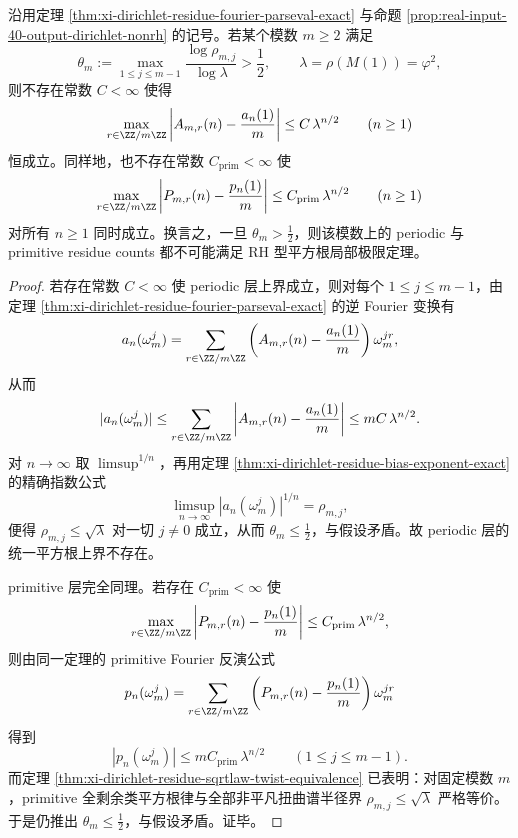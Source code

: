 \begin{theorem}\label{thm:xi-dirichlet-local-limit-sqrt-barrier}
沿用定理 \ref{thm:xi-dirichlet-residue-fourier-parseval-exact} 与命题 \ref{prop:real-input-40-output-dirichlet-nonrh} 的记号。若某个模数 \(m\ge 2\) 满足
\[
\theta_m:=\max_{1\le j\le m-1}\frac{\log\rho_{m,j}}{\log\lambda}>\frac12,
\qquad
\lambda=\rho(M(1))=\varphi^2,
\]
则不存在常数 \(C<\infty\) 使得
\[
\max_{r\in\ZZ/m\ZZ}\left|A_{m,r}(n)-\frac{a_n(1)}{m}\right|
\le C\,\lambda^{n/2}
\qquad (n\ge 1)
\]
恒成立。同样地，也不存在常数 \(C_{\mathrm{prim}}<\infty\) 使
\[
\max_{r\in\ZZ/m\ZZ}\left|P_{m,r}(n)-\frac{p_n(1)}{m}\right|
\le C_{\mathrm{prim}}\,\lambda^{n/2}
\qquad (n\ge 1)
\]
对所有 \(n\ge 1\) 同时成立。换言之，一旦 \(\theta_m>\frac12\)，则该模数上的 periodic 与 primitive residue counts 都不可能满足 RH 型平方根局部极限定理。
\end{theorem}
\begin{proof}
若存在常数 \(C<\infty\) 使 periodic 层上界成立，则对每个 \(1\le j\le m-1\)，由定理 \ref{thm:xi-dirichlet-residue-fourier-parseval-exact} 的逆 Fourier 变换有
\[
a_n(\omega_m^j)
=
\sum_{r\in\ZZ/m\ZZ}
\left(A_{m,r}(n)-\frac{a_n(1)}{m}\right)\omega_m^{jr},
\]
从而
\[
|a_n(\omega_m^j)|
\le
\sum_{r\in\ZZ/m\ZZ}\left|A_{m,r}(n)-\frac{a_n(1)}{m}\right|
\le
mC\,\lambda^{n/2}.
\]
对 \(n\to\infty\) 取 \(\limsup^{1/n}\)，再用定理 \ref{thm:xi-dirichlet-residue-bias-exponent-exact} 的精确指数公式
\[
\limsup_{n\to\infty}|a_n(\omega_m^j)|^{1/n}=\rho_{m,j},
\]
便得 \(\rho_{m,j}\le \sqrt{\lambda}\) 对一切 \(j\neq 0\) 成立，从而 \(\theta_m\le \frac12\)，与假设矛盾。故 periodic 层的统一平方根上界不存在。

primitive 层完全同理。若存在 \(C_{\mathrm{prim}}<\infty\) 使
\[
\max_{r\in\ZZ/m\ZZ}\left|P_{m,r}(n)-\frac{p_n(1)}{m}\right|
\le C_{\mathrm{prim}}\,\lambda^{n/2},
\]
则由同一定理的 primitive Fourier 反演公式
\[
p_n(\omega_m^j)
=
\sum_{r\in\ZZ/m\ZZ}
\left(P_{m,r}(n)-\frac{p_n(1)}{m}\right)\omega_m^{jr}
\]
得到
\[
|p_n(\omega_m^j)|\le mC_{\mathrm{prim}}\,\lambda^{n/2}
\qquad (1\le j\le m-1).
\]
而定理 \ref{thm:xi-dirichlet-residue-sqrtlaw-twist-equivalence} 已表明：对固定模数 \(m\)，primitive 全剩余类平方根律与全部非平凡扭曲谱半径界 \(\rho_{m,j}\le \sqrt{\lambda}\) 严格等价。于是仍推出 \(\theta_m\le \frac12\)，与假设矛盾。证毕。
\end{proof}


